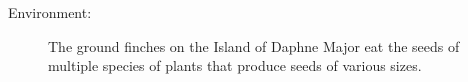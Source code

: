 \begin{frame}[t]
\begin{adjustwidth}{-1.5em}{-1.5em}


    \begin{description}
        \item[Environment:]
            The ground finches on the Island of Daphne Major eat the seeds of
            multiple species of plants that produce seeds of various sizes.
    \end{description}

\end{adjustwidth}
\end{frame}

